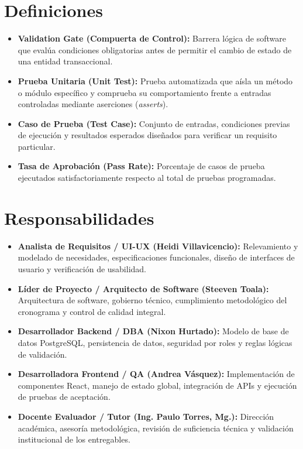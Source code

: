 \documentclass[12pt,a4paper]{article}
\begin{document}
\section{Definiciones}
\begin{itemize}[leftmargin=1.5em, itemsep=2pt]
    \item \textbf{Validation Gate (Compuerta de Control):} Barrera lógica de software que evalúa condiciones obligatorias antes de permitir el cambio de estado de una entidad transaccional.
    \item \textbf{Prueba Unitaria (Unit Test):} Prueba automatizada que aísla un método o módulo específico y comprueba su comportamiento frente a entradas controladas mediante aserciones (\textit{asserts}).
    \item \textbf{Caso de Prueba (Test Case):} Conjunto de entradas, condiciones previas de ejecución y resultados esperados diseñados para verificar un requisito particular.
    \item \textbf{Tasa de Aprobación (Pass Rate):} Porcentaje de casos de prueba ejecutados satisfactoriamente respecto al total de pruebas programadas.
\end{itemize}

\section{Responsabilidades}
\begin{itemize}[leftmargin=1.5em, itemsep=2pt]
    \item \textbf{Analista de Requisitos / UI-UX (Heidi Villavicencio):} Relevamiento y modelado de necesidades, especificaciones funcionales, diseño de interfaces de usuario y verificación de usabilidad.
    \item \textbf{Líder de Proyecto / Arquitecto de Software (Steeven Toala):} Arquitectura de software, gobierno técnico, cumplimiento metodológico del cronograma y control de calidad integral.
    \item \textbf{Desarrollador Backend / DBA (Nixon Hurtado):} Modelo de base de datos PostgreSQL, persistencia de datos, seguridad por roles y reglas lógicas de validación.
    \item \textbf{Desarrolladora Frontend / QA (Andrea Vásquez):} Implementación de componentes React, manejo de estado global, integración de APIs y ejecución de pruebas de aceptación.
    \item \textbf{Docente Evaluador / Tutor (Ing. Paulo Torres, Mg.):} Dirección académica, asesoría metodológica, revisión de suficiencia técnica y validación institucional de los entregables.
\end{itemize}
\end{document}
